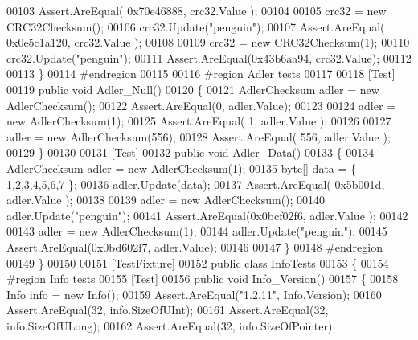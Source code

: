 \begin{DoxyCode}
00103             Assert.AreEqual( 0x70e46888, crc32.Value  );
00104 
00105             crc32 = \textcolor{keyword}{new} CRC32Checksum();
00106             crc32.Update(\textcolor{stringliteral}{"penguin"});
00107             Assert.AreEqual( 0x0e5c1a120, crc32.Value );
00108 
00109             crc32 = \textcolor{keyword}{new} CRC32Checksum(1);
00110             crc32.Update(\textcolor{stringliteral}{"penguin"});
00111             Assert.AreEqual(0x43b6aa94, crc32.Value);
00112 
00113         \}
00114 \textcolor{preprocessor}{        #endregion}
00115 
00116 \textcolor{preprocessor}{        #region Adler tests}
00117 
00118         [Test]
00119         \textcolor{keyword}{public} \textcolor{keywordtype}{void} Adler\_Null()
00120         \{
00121             AdlerChecksum adler = \textcolor{keyword}{new} AdlerChecksum();
00122             Assert.AreEqual(0, adler.Value);
00123 
00124             adler = \textcolor{keyword}{new} AdlerChecksum(1);
00125             Assert.AreEqual( 1, adler.Value );
00126 
00127             adler = \textcolor{keyword}{new} AdlerChecksum(556);
00128             Assert.AreEqual( 556, adler.Value );
00129         \}
00130 
00131         [Test]
00132         \textcolor{keyword}{public} \textcolor{keywordtype}{void} Adler\_Data()
00133         \{
00134             AdlerChecksum adler = \textcolor{keyword}{new} AdlerChecksum(1);
00135             byte[] data = \{ 1,2,3,4,5,6,7 \};
00136             adler.Update(data);
00137             Assert.AreEqual( 0x5b001d, adler.Value  );
00138 
00139             adler = \textcolor{keyword}{new} AdlerChecksum();
00140             adler.Update(\textcolor{stringliteral}{"penguin"});
00141             Assert.AreEqual(0x0bcf02f6, adler.Value );
00142 
00143             adler = \textcolor{keyword}{new} AdlerChecksum(1);
00144             adler.Update(\textcolor{stringliteral}{"penguin"});
00145             Assert.AreEqual(0x0bd602f7, adler.Value);
00146 
00147         \}
00148 \textcolor{preprocessor}{        #endregion}
00149     \}
00150 
00151     [TestFixture]
00152     \textcolor{keyword}{public} \textcolor{keyword}{class }InfoTests
00153     \{
00154 \textcolor{preprocessor}{        #region Info tests}
00155         [Test]
00156         \textcolor{keyword}{public} \textcolor{keywordtype}{void} Info\_Version()
00157         \{
00158             Info info = \textcolor{keyword}{new} Info();
00159             Assert.AreEqual(\textcolor{stringliteral}{"1.2.11"}, Info.Version);
00160             Assert.AreEqual(32, info.SizeOfUInt);
00161             Assert.AreEqual(32, info.SizeOfULong);
00162             Assert.AreEqual(32, info.SizeOfPointer);

\end{DoxyCode}

